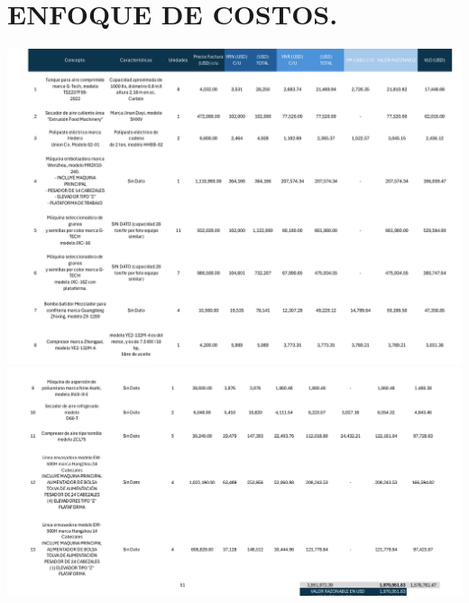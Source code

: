 
\chapter{ENFOQUE DE COSTOS.} %

\includegraphics[width=  \linewidth, page = 1]{../0.imagenes/enfoque_costos/1}
\newpage
\includegraphics[width=  \linewidth, page = 1]{../0.imagenes/enfoque_costos/2}

